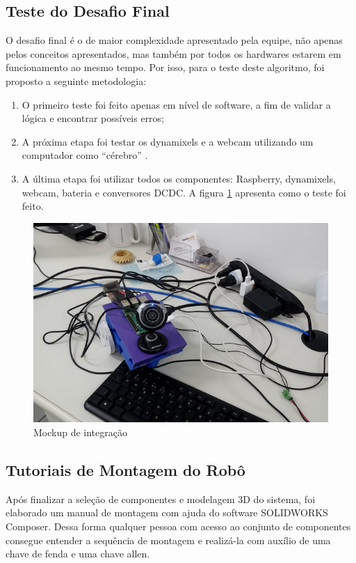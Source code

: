 \subsection{Teste do Desafio Final}

O desafio final é o de maior complexidade apresentado pela equipe, não apenas pelos conceitos apresentados, mas também por todos os hardwares estarem em funcionamento ao mesmo tempo. Por isso, para o teste deste algoritmo, foi proposto a seguinte metodologia:

\begin{enumerate}
	\item O primeiro teste foi feito apenas em nível de software, a fim de validar a lógica e encontrar possíveis erros;
	\item A próxima etapa foi testar os dynamixels e a webcam utilizando um computador como “cérebro” .
	\item A última etapa foi utilizar todos os componentes: Raspberry, dynamixels, webcam, bateria e conversores DCDC. A figura \ref{fig:testefinal} apresenta como o teste foi feito.
\end{enumerate}
 
 \begin{figure}[H]
 	\centering
 	\includegraphics[scale=0.75, angle=0]{Figures/testefinal.png}
 	\caption{Mockup de integração}
 	\label{fig:testefinal}
 \end{figure}

\subsection{Tutoriais de Montagem do Robô}
Após finalizar a seleção de componentes e modelagem 3D do sistema, foi elaborado um manual de montagem com ajuda do software SOLIDWORKS Composer. Dessa forma
qualquer pessoa com acesso ao conjunto de componentes consegue entender a sequência de montagem e realizá-la com auxílio de uma chave de fenda e uma chave allen. \cite{tutMont}

